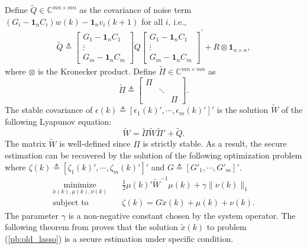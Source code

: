 \documentclass[12pt]{article}  %
\newcommand{\Cb}{{\mathbb{C}}}
\begin{document}
Define $\tilde{Q} \in \Cb^{m n \times m n}$ as the covariance of noise term $\left(G_{i}-\mathbf{1}_{n} C_{i}\right) w(k) -\mathbf{1}_{n} v_{i}(k+1)$ for all $i$, i.e.,
\begin{align}
	\tilde{Q} \triangleq
	\begin{bmatrix}
		G_1-\mathbf{1}_{n} C_1 \\
		\vdots \\
		G_m-\mathbf{1}_{n} C_m
	\end{bmatrix}
	Q\begin{bmatrix}
		G_1-\mathbf{1}_{n} C_1 \\
		\vdots \\
		G_m-\mathbf{1}_{n} C_m
	\end{bmatrix}^{'}
	+ R\otimes \mathbf{1}_{n\times n},
\end{align}
where $\otimes$ is the Kronecker product.
Define $\tilde{\Pi}\in \Cb^{m n \times m n}$ as
$$
\tilde{\Pi} \triangleq\left[\begin{array}{ccc}
	\Pi & & \\
	& \ddots & \\
	& & \Pi
\end{array}\right].
$$
The stable covariance of $\epsilon(k)\triangleq\left[\epsilon_1(k){'},\cdots,\epsilon_m(k){'}\right]{'}$ is the solution $\tilde{W}$ of the following Lyapunov equation:
$$
\tilde{W}=\tilde{\Pi} \tilde{W} \tilde{\Pi}{'}+\tilde{Q}.
$$ 
The matrix $\tilde{W}$ is well-defined since $\Pi$ is strictly stable. As a result, the secure estimation can be recovered by the solution of the following optimization problem where $\zeta(k)\triangleq\left[\zeta_1(k){'},\cdots,\zeta_m(k){'}\right]{'} $ and $G\triangleq\left[G{'}_1,\cdots,G{'}_m\right]{'} $.
\begin{subequations}\label{pb:old_lasso}
	\begin{align}
		\underset{\check{x}(k), \mu(k), \nu(k)}{\operatorname{minimize}}&\quad \frac{1}{2} \mu(k){'} \tilde{W}^{-1} \mu(k) + \gamma \|\nu(k)\|_1 \label{min:old_lasso} \\
		\text{subject to }&\quad
		\zeta(k)=
		G \check{x}(k)+\mu(k)+\nu(k). \label{eq:old_lasso}
	\end{align}
\end{subequations}
The parameter $\gamma$ is a non-negative constant chosen by the system operator. The following theorem from \cite{liuxinghua-TAC2020} proves that the solution $\check{x}(k)$ to problem (\ref{pb:old_lasso}) is a secure estimation under specific condition.
\end{document}
